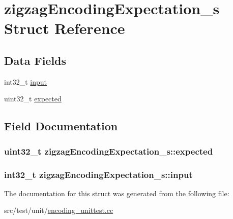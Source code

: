 \hypertarget{structzigzagEncodingExpectation__s}{\section{zigzag\+Encoding\+Expectation\+\_\+s Struct Reference}
\label{structzigzagEncodingExpectation__s}
}
\subsection*{Data Fields}
\begin{DoxyCompactItemize}
\item 
int32\+\_\+t \hyperlink{structzigzagEncodingExpectation__s_a860e10615b92f3505307b9bc1fa32be2}{input}
\item 
uint32\+\_\+t \hyperlink{structzigzagEncodingExpectation__s_ad7dc29e3cce791b3223748b7714d6aa9}{expected}
\end{DoxyCompactItemize}


\subsection{Field Documentation}
\hypertarget{structzigzagEncodingExpectation__s_ad7dc29e3cce791b3223748b7714d6aa9}{
\subsubsection[{expected}]{\setlength{\rightskip}{0pt plus 5cm}uint32\+\_\+t zigzag\+Encoding\+Expectation\+\_\+s\+::expected}}\label{structzigzagEncodingExpectation__s_ad7dc29e3cce791b3223748b7714d6aa9}
\hypertarget{structzigzagEncodingExpectation__s_a860e10615b92f3505307b9bc1fa32be2}{
\subsubsection[{input}]{\setlength{\rightskip}{0pt plus 5cm}int32\+\_\+t zigzag\+Encoding\+Expectation\+\_\+s\+::input}}\label{structzigzagEncodingExpectation__s_a860e10615b92f3505307b9bc1fa32be2}


The documentation for this struct was generated from the following file\+:\begin{DoxyCompactItemize}
\item 
src/test/unit/\hyperlink{encoding__unittest_8cc}{encoding\+\_\+unittest.\+cc}\end{DoxyCompactItemize}
